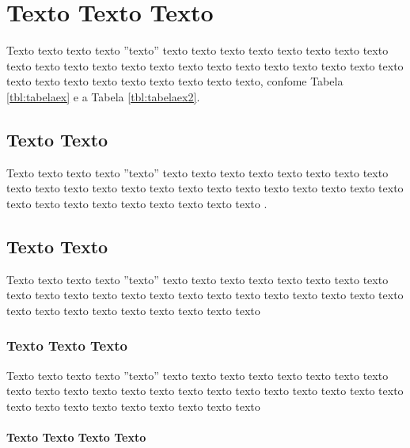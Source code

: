 \chapter{Texto Texto Texto}

Texto texto texto texto ''texto'' texto texto texto texto texto texto texto texto texto texto texto texto texto texto texto texto texto texto texto texto texto texto texto texto texto texto texto texto texto texto texto, confome Tabela \ref{tbl:tabelaex} e a Tabela \ref{tbl:tabelaex2}.





\section{Texto Texto}

Texto texto texto texto ''texto'' texto texto texto texto texto texto texto texto texto texto texto texto texto texto texto texto texto texto texto texto texto texto texto texto texto texto texto texto texto texto texto \cite{gil2002elaborar}.


\section{Texto Texto}

Texto texto texto texto ''texto'' texto texto texto texto texto texto texto texto texto texto texto texto texto texto texto texto texto texto texto texto texto texto texto texto texto texto texto texto texto texto texto

\subsection{Texto Texto Texto}

Texto texto texto texto ''texto'' texto texto texto texto texto texto texto texto texto texto texto texto texto texto texto texto texto texto texto texto texto texto texto texto texto texto texto texto texto texto texto


\subsubsection{Texto Texto Texto Texto}

